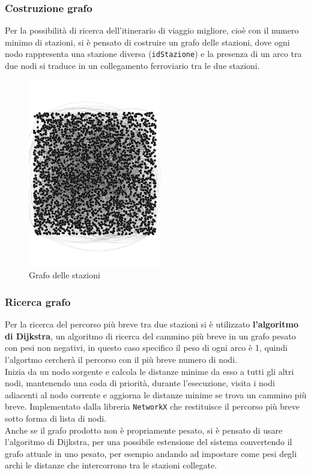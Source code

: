\documentclass[italian,12pt,a4paper]{article}
\begin{document}
			\subsubsection{Costruzione grafo}
				Per la possibilità di ricerca dell'itinerario di viaggio migliore, cioè con il numero minimo di stazioni, si è pensato di costruire un grafo delle stazioni, dove ogni nodo rappresenta una stazione diversa (\texttt{idStazione}) e la presenza di un arco tra due nodi si traduce in un collegamento ferroviario tra le due stazioni.
				\\
				\begin{figure}[t]
					\centering
					\includegraphics[width=220px]{img/stations}
					\caption{Grafo delle stazioni}
					\label{fig:stationsgraph}
				\end{figure}
				
			\subsubsection{Ricerca grafo}
				
					Per la ricerca del percorso più breve tra due stazioni si è utilizzato \textbf{l'algoritmo di Dijkstra}, un algoritmo di ricerca del cammino più breve in un grafo pesato con pesi non negativi, in questo caso specifico il peso di ogni arco è 1, quindi l'algortmo cercherà il percorso con il più breve numero di nodi.\\
					Inizia da un nodo sorgente e calcola le distanze minime da esso a tutti gli altri nodi, mantenendo una coda di priorità, durante l'esecuzione, visita i nodi adiacenti al nodo corrente e aggiorna le distanze minime se trova un cammino più breve. Implementato dalla libreria \texttt{NetworkX} che restituisce il percorso più breve sotto forma di lista di nodi. \\
					\linebreak
					Anche se il grafo prodotto non è propriamente pesato, si è pensato di usare l'algoritmo di Dijkstra, per una possibile estensione del sistema convertendo il grafo attuale in uno pesato, per esempio andando ad impostare come pesi degli archi le distanze che intercorrono tra le stazioni collegate.
					
\end{document}
